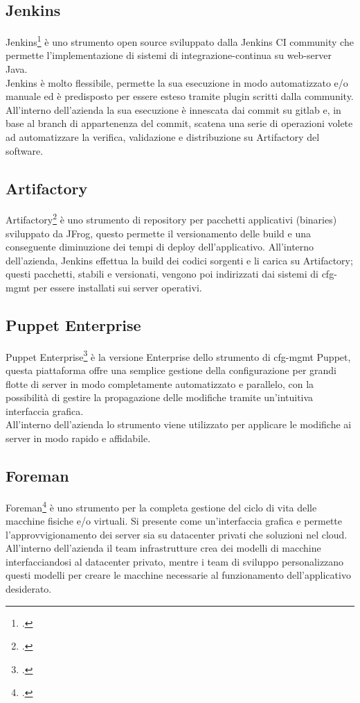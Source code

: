 \subsection{Jenkins}
Jenkins\footcite{site:jenkins} è uno strumento open source sviluppato dalla Jenkins CI community che permette l'implementazione di sistemi di \gls{integrazione-continua} su web-server Java. \\
Jenkins è molto flessibile, permette la sua esecuzione in modo automatizzato e/o manuale ed è predisposto per essere esteso tramite plugin scritti dalla community. \\
All'interno dell'azienda la sua esecuzione è innescata dai commit su gitlab e, in base al \gls{branch} di appartenenza del commit, scatena una serie di operazioni volete ad automatizzare la verifica, validazione e distribuzione su Artifactory del software.
\subsection{Artifactory}
Artifactory\footcite{site:artifactory} è uno strumento di repository per pacchetti applicativi (binaries) sviluppato da JFrog, questo permette il versionamento delle \gls{build} e una conseguente diminuzione dei tempi di \gls{deploy} dell'applicativo.
All'interno dell'azienda, Jenkins effettua la \gls{build} dei codici sorgenti e li carica su Artifactory; questi pacchetti, stabili e versionati, vengono poi indirizzati dai sistemi di \gls{cfg-mgmt} per essere installati sui server operativi.
\subsection{Puppet Enterprise}
Puppet Enterprise\footcite{site:puppet} è la versione Enterprise dello strumento di \gls{cfg-mgmt} Puppet, questa piattaforma offre una semplice gestione della configurazione per grandi flotte di server in modo completamente automatizzato e parallelo, con la possibilità di gestire la propagazione delle modifiche tramite un'intuitiva interfaccia grafica.\\
All'interno dell'azienda lo strumento viene utilizzato per applicare le modifiche ai server in modo rapido e affidabile.
\subsection{Foreman}
Foreman\footcite{site:foreman} è uno strumento per la completa gestione del ciclo di vita delle macchine fisiche e/o virtuali. Si presente come un'interfaccia grafica e permette l'approvvigionamento dei server sia su \gls{datacenter} privati che soluzioni nel cloud. \\
All'interno dell'azienda il team infrastrutture crea dei modelli di macchine interfacciandosi al \gls{datacenter} privato, mentre i team di sviluppo personalizzano questi modelli per creare le macchine necessarie al funzionamento dell'applicativo desiderato.
